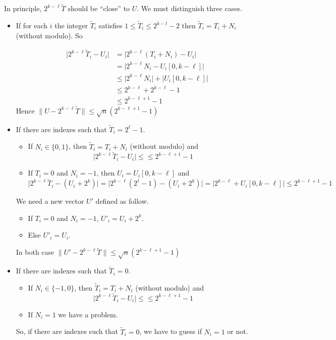 \documentclass[submission,svgnames,journal=tosc]{iacrtrans}
\begin{document}
In principle, $2^{k-\ell} \widetilde{T}$ should be ``close'' to \(U\). We must distinguish three cases.
\begin{itemize}
	\item If for each \(i\) the integer \(\widetilde{T}_i\) satisfies \(1\leqslant\widetilde{T}_i\leqslant 2^{k-l}-2\) then \(\widetilde{T}_i = T_i + N_i\) (without modulo). So
	
	\begin{align*}
	\lvert 2^{k-\ell}\widetilde{T}_i-U_i \rvert &=\lvert 2^{k-\ell}(T_i + N_i)-U_i \rvert \\
	 &= \lvert 2^{k-\ell}N_i - U_i[0,k-\ell] \rvert\\
	 &\leqslant \lvert 2^{k-\ell}N_i\rvert + \lvert U_i[0,k-\ell] \rvert \\
	 &\leqslant 2^{k-\ell} + 2^{k-\ell}-1\\
	 &\leqslant 2^{k-\ell +1 }- 1
	\end{align*}
	Hence \(\lVert U -2^{k-\ell} \widetilde{T} \rVert \leqslant \sqrt{n}(2^{k-\ell+1}-1) \)
	
	\item If there are indexes such that \(\widetilde{T}_i = 2^\ell-1\).
	\begin{itemize}
		\item If \(N_i \in \{0,1\}\), then \(\widetilde{T}_i = T_i + N_i\) (without modulo) and \[\lvert 2^{k-\ell}\widetilde{T}_i-U_i \rvert \leqslant \leqslant 2^{k-\ell +1 }- 1\]
		\item If \(T_i = 0\) and \(N_i = -1\), then \(U_i=U_i[0,k-\ell]\) and  \[\lvert 2^{k-\ell}\widetilde{T}_i-(U_i + 2^k) \rvert =\lvert 2^{k-\ell}(2^\ell -1) -(U_i + 2^k) \rvert = \lvert 2^{k-\ell} + U_i[0,k-\ell]\rvert \leqslant 2^{k-\ell + 1} -1 \]
	\end{itemize}
	We need a new vector \(U'\) defined as follow.
	\begin{itemize}
		\item If \(T_i = 0\) and \(N_i = -1\), \(U'_i=U_i+2^k\).
		\item Else \(U'_i=U_i\).
	\end{itemize}
	In both case \(\lVert U' -2^{k-\ell} \widetilde{T} \rVert \leqslant \sqrt{n}(2^{k-\ell+1}-1) \)
	\item If there are indexes such that \(\widetilde{T}_i = 0\).
	\begin{itemize}
		\item  If  \(N_i \in \{-1,0\}\), then \(\widetilde{T}_i = T_i + N_i\) (without modulo) and \[\lvert 2^{k-\ell}\widetilde{T}_i-U_i \rvert \leqslant \leqslant 2^{k-\ell +1 }- 1\]
		\item If \(N_i = 1\) we have a problem.
	\end{itemize}
	So, if there are indexes such that \(\widetilde{T}_i = 0\), we have to guess if \(N_i=1\) or not.

\end{itemize}
\end{document}
